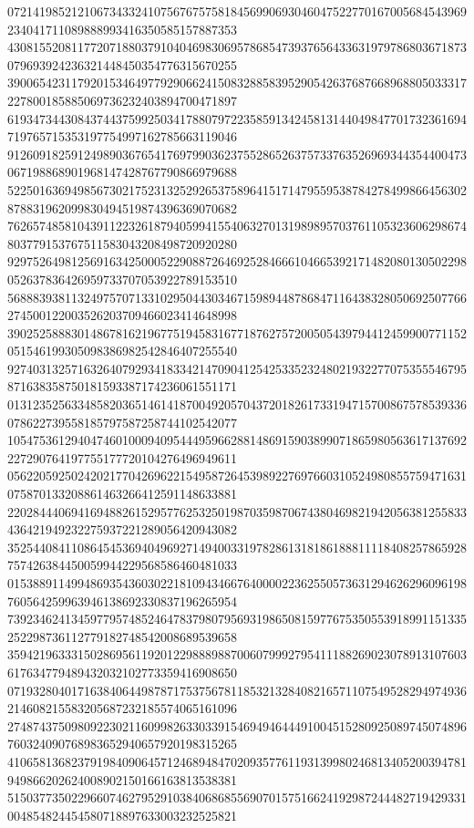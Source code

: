 \begin{DoxyCode}
      072141985212106734332410756767575818456990693046047522770167005684543969234041711089888993416350585157887353
      430815520811772071880379104046983069578685473937656433631979786803671873079693924236321448450354776315670255
      390065423117920153464977929066241508328858395290542637687668968805033317227800185885069736232403894700471897
      619347344308437443759925034178807972235859134245813144049847701732361694719765715353197754997162785663119046
      912609182591249890367654176979903623755286526375733763526969344354400473067198868901968147428767790866979688
      522501636949856730217523132529265375896415171479559538784278499866456302878831962099830494519874396369070682
      762657485810439112232618794059941554063270131989895703761105323606298674803779153767511583043208498720920280
      929752649812569163425000522908872646925284666104665392171482080130502298052637836426959733707053922789153510
      568883938113249757071331029504430346715989448786847116438328050692507766274500122003526203709466023414648998
      390252588830148678162196775194583167718762757200505439794412459900771152051546199305098386982542846407255540
      927403132571632640792934183342147090412542533523248021932277075355546795871638358750181593387174236061551171
      013123525633485820365146141870049205704372018261733194715700867578539336078622739558185797587258744102542077
      105475361294047460100094095444959662881486915903899071865980563617137692227290764197755177720104276496949611
      056220592502420217704269622154958726453989227697660310524980855759471631075870133208861463266412591148633881
      220284440694169488261529577625325019870359870674380469821942056381255833436421949232275937221289056420943082
      352544084110864545369404969271494003319782861318186188811118408257865928757426384450059944229568586460481033
      015388911499486935436030221810943466764000022362550573631294626296096198760564259963946138692330837196265954
      739234624134597795748524647837980795693198650815977675350553918991151335252298736112779182748542008689539658
      359421963331502869561192012298889887006079992795411188269023078913107603617634779489432032102773359416908650
      071932804017163840644987871753756781185321328408216571107549528294974936214608215583205687232185574065161096
      274874375098092230211609982633033915469494644491004515280925089745074896760324090768983652940657920198315265
      410658136823791984090645712468948470209357761193139980246813405200394781949866202624008902150166163813538381
      515037735022966074627952910384068685569070157516624192987244482719429331004854824454580718897633003232525821

\end{DoxyCode}
